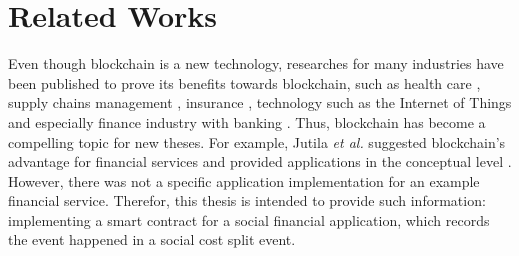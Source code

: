 \chapter{Related Works}
\label{ch:RelatedWorks}

Even though blockchain is a new technology, researches for many industries have been published to prove its benefits towards blockchain, such as health care \citep{DEMARINIS2018400}, supply chains management \citep{doi:10.1080/00207543.2018.1533261}, insurance \citep{Zhou2018}, technology such as the Internet of Things \citep{REYNA2018173} and especially finance industry with banking \citep{Guo2016}. Thus, blockchain has become a compelling topic for new theses. For example, Jutila \emph{et al.} suggested blockchain's advantage for financial services and provided applications in the conceptual level \citep{LauraJutila2017}. However, there was not a specific application implementation for an example financial service. Therefor, this thesis is intended to provide such information: implementing a smart contract for a social financial application, which records the event happened in a social cost split event.